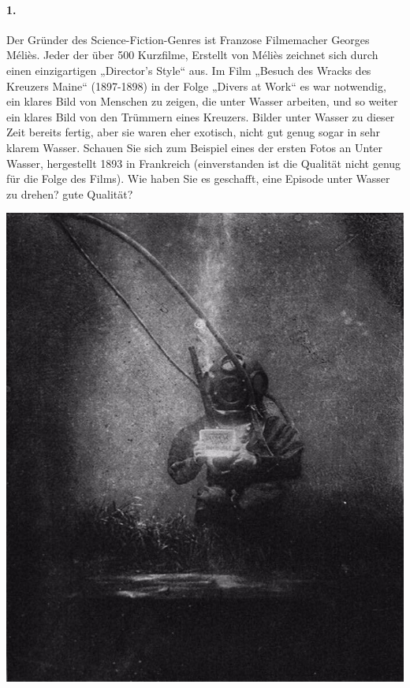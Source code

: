 \documentclass[11pt,a4paper]{article}
\begin{document}
\begin{minipage}{.6\textwidth}
  \paragraph{1.}
  Der Gründer des Science-Fiction-Genres ist Franzose Filmemacher Georges
  Méliès. Jeder der über 500 Kurzfilme, Erstellt von Méliès zeichnet sich
  durch einen einzigartigen „Director's Style“ aus. Im Film „Besuch des Wracks
  des Kreuzers Maine“ (1897-1898) in der Folge „Divers at Work“ es war
  notwendig, ein klares Bild von Menschen zu zeigen, die unter Wasser
  arbeiten, und so weiter ein klares Bild von den Trümmern eines Kreuzers.
  Bilder unter Wasser zu dieser Zeit bereits fertig, aber sie waren eher
  exotisch, nicht gut genug sogar in sehr klarem Wasser. Schauen Sie sich zum
  Beispiel eines der ersten Fotos an Unter Wasser, hergestellt 1893 in
  Frankreich (einverstanden ist die Qualität nicht genug für die Folge des
  Films). Wie haben Sie es geschafft, eine Episode unter Wasser zu drehen?
  gute Qualität?
\end{minipage} \hfill
\begin{minipage}{.35\textwidth}
  \includegraphics[width =\textwidth]{Bild-1.jpg}
\end{minipage}
\medskip
\end{document}
